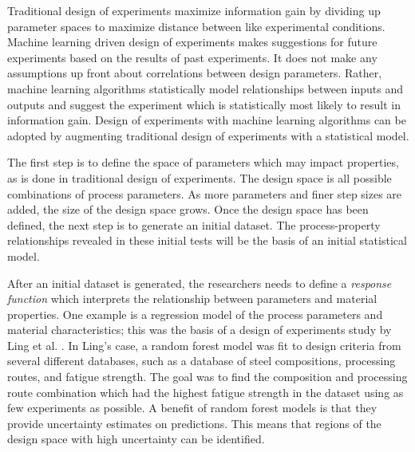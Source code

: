 Traditional design of experiments maximize information gain by dividing up parameter spaces to maximize distance between like experimental conditions. Machine learning driven design of experiments makes suggestions for future experiments based on the results of past experiments. It does not make any assumptions up front about correlations between design parameters. Rather, machine learning algorithms statistically model relationships between inputs and outputs and suggest the experiment which is statistically most likely to result in information gain. Design of experiments with machine learning algorithms can be adopted by augmenting traditional design of experiments with a statistical model.

The first step is to define the space of parameters which may impact properties, as is done in traditional design of experiments. The design space is all possible combinations of process parameters. As more parameters and finer step sizes are added, the size of the design space grows. Once the design space has been defined, the next step is to generate an initial dataset. The process-property relationships revealed in these initial tests will be the basis of an initial statistical model. 

After an initial dataset is generated, the researchers needs to define a \textit{response function} which interprets the relationship between parameters and material properties. One example is a regression model of the process parameters and material characteristics; this was the basis of a design of experiments study by Ling et al. \cite{Ling2017a}. In Ling's case, a random forest model was fit to design criteria from several different databases, such as a database of steel compositions, processing routes, and fatigue strength. The goal was to find the composition and processing route combination which had the highest fatigue strength in the dataset using as few experiments as possible. A benefit of random forest models is that they provide uncertainty estimates on predictions. This means that regions of the design space with high uncertainty can be identified.


